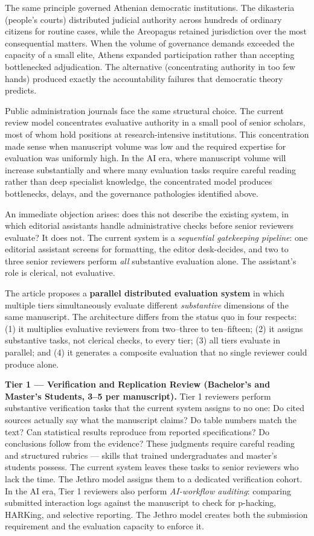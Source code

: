 \documentclass[12pt]{article}
\begin{document}
The same principle governed Athenian democratic institutions. The dikasteria (people's courts)
distributed judicial authority across hundreds of ordinary citizens for routine cases, while
the Areopagus retained jurisdiction over the most consequential matters. When the volume of
governance demands exceeded the capacity of a small elite, Athens expanded participation
rather than accepting bottlenecked adjudication. The alternative (concentrating authority
in too few hands) produced exactly the accountability failures that democratic theory
predicts.

Public administration journals face the same structural choice. The current review model
concentrates evaluative authority in a small pool of senior scholars, most of whom hold
positions at research-intensive institutions. This concentration made sense when manuscript
volume was low and the required expertise for evaluation was uniformly high. In the AI era,
where manuscript volume will increase substantially and where many evaluation tasks require
careful reading rather than deep specialist knowledge, the concentrated model produces
bottlenecks, delays, and the governance pathologies identified above.

An immediate objection arises: does this not describe the existing system, in which editorial
assistants handle administrative checks before senior reviewers evaluate? It does not. The
current system is a \emph{sequential gatekeeping pipeline}: one editorial assistant screens
for formatting, the editor desk-decides, and two to three senior reviewers perform
\emph{all} substantive evaluation alone. The assistant's role is clerical, not evaluative.

The article proposes a \textbf{parallel distributed evaluation system} in which multiple tiers
simultaneously evaluate different \emph{substantive} dimensions of the same manuscript.
The architecture differs from the status quo in four respects: (1) it multiplies evaluative
reviewers from two--three to ten--fifteen; (2) it assigns substantive tasks, not clerical
checks, to every tier; (3) all tiers evaluate in parallel; and (4) it generates a composite
evaluation that no single reviewer could produce alone.

\textbf{Tier 1 --- Verification and Replication Review (Bachelor's and Master's Students,
3--5 per manuscript).}
Tier 1 reviewers perform substantive verification tasks that the current system assigns to
no one: Do cited sources actually say what the manuscript claims? Do table numbers match
the text? Can statistical results reproduce from reported specifications? Do conclusions
follow from the evidence? These judgments require careful reading and structured rubrics ---
skills that trained undergraduates and master's students possess. The current system leaves
these tasks to senior reviewers who lack the time. The Jethro model assigns them to a
dedicated verification cohort.
In the AI era, Tier 1 reviewers also perform \emph{AI-workflow auditing}: comparing
submitted interaction logs against the manuscript to check for p-hacking, HARKing, and
selective reporting. The Jethro model creates both the submission requirement and the
evaluation capacity to enforce it.
\end{document}
